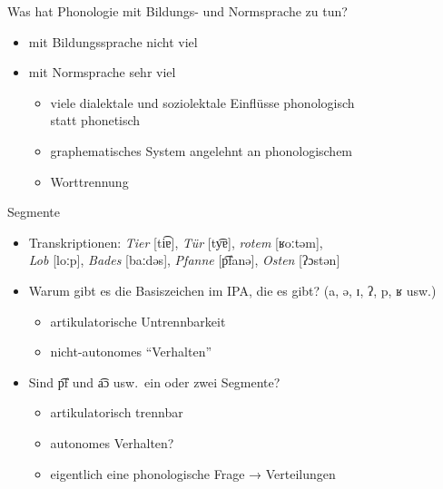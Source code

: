 \begin{frame}
  {Was hat Phonologie mit Bildungs- und Normsprache zu tun?}
  \pause
  \begin{itemize}[<+->]
    \item mit Bildungssprache nicht viel
    \item mit Normsprache sehr viel
      \begin{itemize}[<+->]
        \item viele dialektale und soziolektale Einflüsse phonologisch\\
          statt phonetisch
        \item graphematisches System angelehnt an phonologischem
        \item Worttrennung
      \end{itemize}
  \end{itemize}
\end{frame}

\begin{frame}
  {Segmente}
  \pause
  \begin{itemize}[<+->]
    \item Transkriptionen: \textit{Tier} [ti͡ɐ], \textit{Tür} [ty͡ɐ], \textit{rotem} [ʁoːtəm],\\
      \textit{Lob} [loːp], \textit{Bades} [baːdəs], \textit{Pfanne} [p͡fanə], \textit{Osten} [ʔɔstən]
      \vspace{\baselineskip}
    \item Warum gibt es die Basiszeichen im IPA, die es gibt? (a, ə, ɪ, ʔ, p, ʁ usw.)
      \begin{itemize}
        \item \alert{artikulatorische Untrennbarkeit}
        \item \alert{nicht-autonomes "`Verhalten"'}
      \end{itemize}
      \vspace{\baselineskip}
    \item Sind p͡f und a͡ɔ usw.\ ein oder zwei Segmente? 
      \begin{itemize}
        \item artikulatorisch trennbar
        \item autonomes Verhalten?
        \item eigentlich eine phonologische Frage → Verteilungen
      \end{itemize}
  \end{itemize}
\end{frame}

